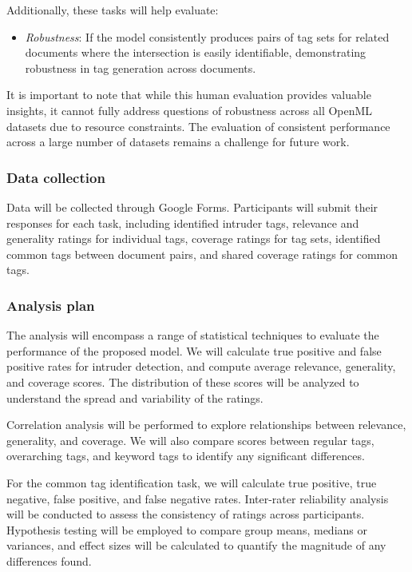 Additionally, these tasks will help evaluate:
\begin{itemize}
\item \textit{Robustness}: If the model consistently produces pairs of tag sets for related documents where the intersection is easily identifiable, demonstrating robustness in tag generation across documents.
\end{itemize}

It is important to note that while this human evaluation provides valuable insights, it cannot fully address questions of robustness across all OpenML datasets due to resource constraints. The evaluation of consistent performance across a large number of datasets remains a challenge for future work.

\subsubsection{Data collection}
Data will be collected through Google Forms. Participants will submit their responses for each task, including identified intruder tags, relevance and generality ratings for individual tags, coverage ratings for tag sets, identified common tags between document pairs, and shared coverage ratings for common tags.

\subsubsection{Analysis plan}
The analysis will encompass a range of statistical techniques to evaluate the performance of the proposed model. We will calculate true positive and false positive rates for intruder detection, and compute average relevance, generality, and coverage scores. The distribution of these scores will be analyzed to understand the spread and variability of the ratings.

Correlation analysis will be performed to explore relationships between relevance, generality, and coverage. We will also compare scores between regular tags, overarching tags, and keyword tags to identify any significant differences.

For the common tag identification task, we will calculate true positive, true negative, false positive, and false negative rates. Inter-rater reliability analysis will be conducted to assess the consistency of ratings across participants. Hypothesis testing will be employed to compare group means, medians or variances, and effect sizes will be calculated to quantify the magnitude of any differences found.

